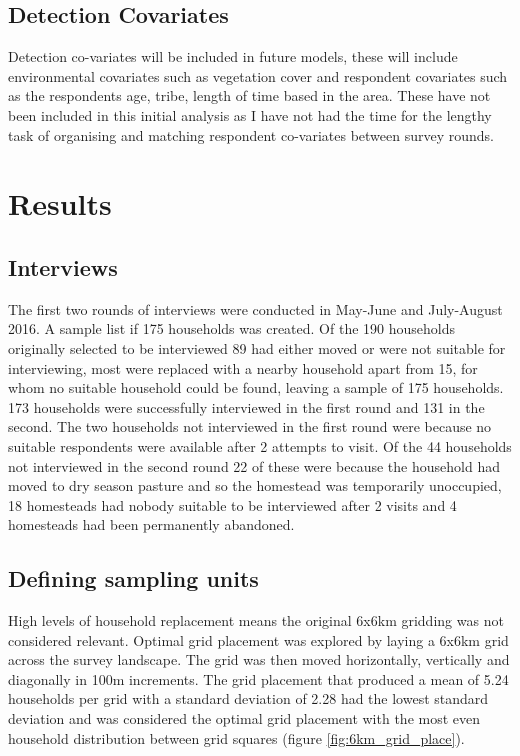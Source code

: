 \subsection*{Detection Covariates}

Detection co-variates will be included in future models, these will include environmental covariates such as vegetation cover and respondent covariates such as the respondents age, tribe, length of time based in the area. These have not been included in this initial analysis as I have not had the time for the lengthy task of organising and matching respondent co-variates between survey rounds.

\section*{Results}

\subsection*{Interviews}
The first two rounds of interviews were conducted in May-June and July-August 2016. A sample list if 175 households was created. Of the 190 households originally selected to be interviewed 89 had either moved or were not suitable for interviewing, most were replaced with a nearby household apart from 15, for whom no suitable household could be found, leaving a sample of 175 households. 173 households were successfully interviewed in the first round and 131 in the second. The two households not interviewed in the first round were because no suitable respondents were available after 2 attempts to visit. Of the 44 households not interviewed in the second round 22 of these were because the household had moved to dry season pasture and so the homestead was temporarily unoccupied, 18 homesteads had nobody suitable to be interviewed after 2 visits and 4 homesteads had been permanently abandoned.

\subsection*{Defining sampling units}
High levels of household replacement means the original 6x6km gridding was not considered relevant. Optimal grid placement was explored by laying a 6x6km grid across the survey landscape. The grid was then moved horizontally, vertically and diagonally in 100m increments. The grid placement that produced a mean of 5.24 households per grid with a standard deviation of 2.28 had the lowest standard deviation and was considered the optimal grid placement with the most even household distribution between grid squares (figure \ref{fig:6km_grid_place}).

